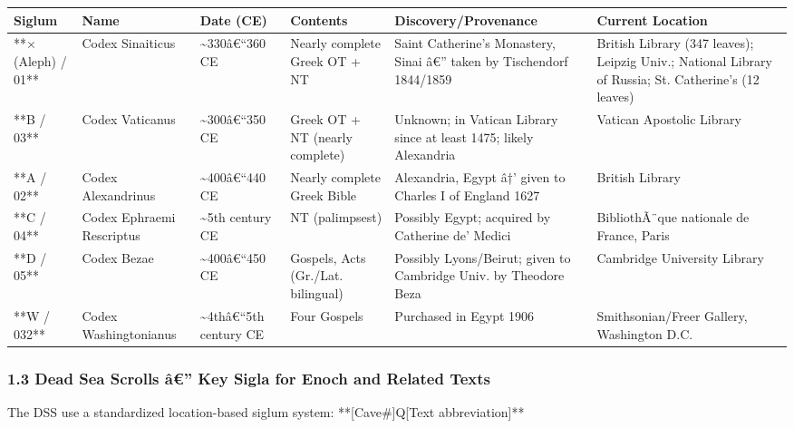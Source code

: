 \documentclass[aps,prd,11pt,onecolumn,superscriptaddress,nofootinbib,floatfix]{revtex4-2}
\begin{document}
\begin{table}[h!]
\centering
\begin{tabular}{p{3cm}p{3cm}p{3cm}p{3cm}p{3cm}p{3cm}}
\hline
Siglum & Name & Date (CE) & Contents & Discovery/Provenance & Current Location \\
\hline
**× (Aleph) / 01** & Codex Sinaiticus & \textasciitilde{}330â€``360 CE & Nearly complete Greek OT + NT & Saint Catherine's Monastery, Sinai â€'' taken by Tischendorf 1844/1859 & British Library (347 leaves); Leipzig Univ.; National Library of Russia; St. Catherine's (12 leaves) \\
**B / 03** & Codex Vaticanus & \textasciitilde{}300â€``350 CE & Greek OT + NT (nearly complete) & Unknown; in Vatican Library since at least 1475; likely Alexandria & Vatican Apostolic Library \\
**A / 02** & Codex Alexandrinus & \textasciitilde{}400â€``440 CE & Nearly complete Greek Bible & Alexandria, Egypt â†' given to Charles I of England 1627 & British Library \\
**C / 04** & Codex Ephraemi Rescriptus & \textasciitilde{}5th century CE & NT (palimpsest) & Possibly Egypt; acquired by Catherine de' Medici & BibliothÃ¨que nationale de France, Paris \\
**D / 05** & Codex Bezae & \textasciitilde{}400â€``450 CE & Gospels, Acts (Gr./Lat. bilingual) & Possibly Lyons/Beirut; given to Cambridge Univ. by Theodore Beza & Cambridge University Library \\
**W / 032** & Codex Washingtonianus & \textasciitilde{}4thâ€``5th century CE & Four Gospels & Purchased in Egypt 1906 & Smithsonian/Freer Gallery, Washington D.C. \\
\hline
\end{tabular}
\end{table}



\subsubsection{1.3 Dead Sea Scrolls â€'' Key Sigla for Enoch and Related Texts}


The DSS use a standardized location-based siglum system: **[Cave\#]Q[Text abbreviation]**
\end{document}
